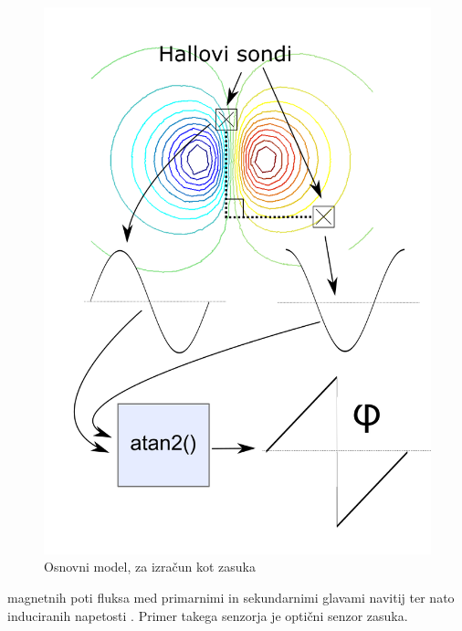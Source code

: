 \begin{figure}[h]
	\centering
	\includegraphics[width=0.9\columnwidth]{./Slike/opis_modela.png}
	\caption{Osnovni model, za izračun kot zasuka}
	\label{opis_modela}
\end{figure}
%
magnetnih poti fluksa med primarnimi in sekundarnimi glavami navitij ter nato induciranih napetosti \cite{Ursic}.
%
%
Primer takega senzorja je optični senzor zasuka.
%
%
